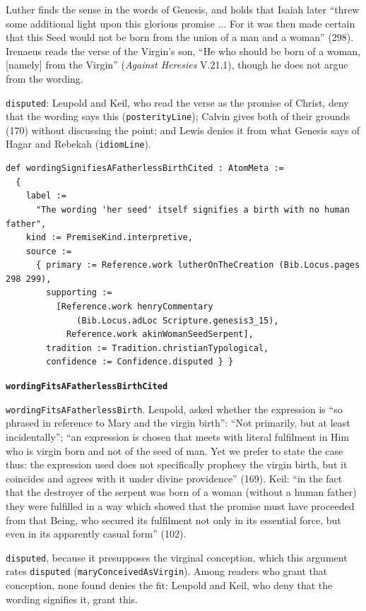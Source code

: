 \documentclass[11pt]{article}
\begin{document}
Luther finds the sense in the words of Genesis, and holds that Isaiah later “threw some additional light upon this glorious promise ... For it was then made certain that this Seed would not be born from the union of a man and a woman” (298). Irenaeus reads the verse of the Virgin’s son, “He who should be born of a woman, [namely] from the Virgin” (\emph{Against Heresies} V.21.1), though he does not argue from the wording.

\texttt{disputed}: Leupold and Keil, who read the verse as the promise of Christ, deny that the wording says this (\texttt{posterity\allowbreak{}Line}); Calvin gives both of their grounds (170) without discussing the point; and Lewis denies it from what Genesis says of Hagar and Rebekah (\texttt{idiom\allowbreak{}Line}).

{\small\begin{verbatim}
def wordingSignifiesAFatherlessBirthCited : AtomMeta :=
  {
    label :=
      "The wording 'her seed' itself signifies a birth with no human father",
    kind := PremiseKind.interpretive,
    source :=
      { primary := Reference.work lutherOnTheCreation (Bib.Locus.pages 298 299),
        supporting :=
          [Reference.work henryCommentary
              (Bib.Locus.adLoc Scripture.genesis3_15),
            Reference.work akinWomanSeedSerpent],
        tradition := Tradition.christianTypological,
        confidence := Confidence.disputed } }
\end{verbatim}}
\par\medskip\noindent\textbf{\texttt{wording\allowbreak{}Fits\allowbreak{}AFatherless\allowbreak{}Birth\allowbreak{}Cited}}\par\nobreak\noindent
\texttt{wording\allowbreak{}Fits\allowbreak{}AFatherless\allowbreak{}Birth}. Leupold, asked whether the expression is “so phrased in reference to Mary and the virgin birth”: “Not primarily, but at least incidentally”; “an expression is chosen that meets with literal fulfilment in Him who is virgin born and not of the seed of man. Yet we prefer to state the case thus: the expression used does not specifically prophesy the virgin birth, but it coincides and agrees with it under divine providence” (169). Keil: “in the fact that the destroyer of the serpent was born of a woman (without a human father) they were fulfilled in a way which showed that the promise must have proceeded from that Being, who secured its fulfilment not only in its essential force, but even in its apparently casual form” (102).

\texttt{disputed}, because it presupposes the virginal conception, which this argument rates \texttt{disputed} (\texttt{mary\allowbreak{}Conceived\allowbreak{}As\allowbreak{}Virgin}). Among readers who grant that conception, none found denies the fit: Leupold and Keil, who deny that the wording signifies it, grant this.
\end{document}
